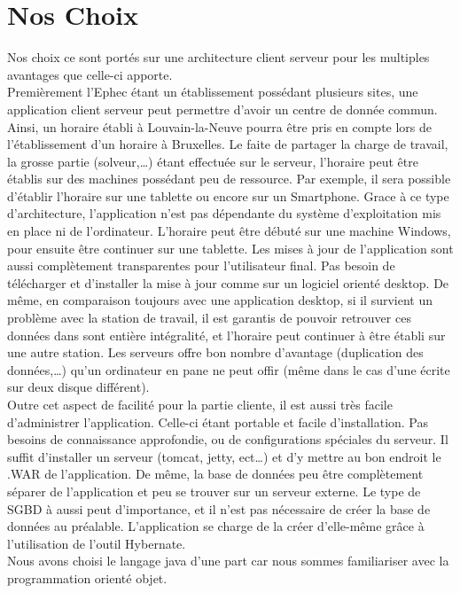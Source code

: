 \section{Nos Choix}
Nos choix ce sont portés sur une architecture client serveur pour les multiples
avantages que celle-ci apporte.\\
Premièrement l'Ephec étant un établissement possédant plusieurs sites,
 une application client serveur peut permettre d'avoir un centre de donnée commun.
 Ainsi, un horaire établi à Louvain-la-Neuve pourra être pris en compte lors de l'établissement d'un horaire à Bruxelles.
Le faite de partager la charge de travail, la grosse partie (solveur,…) étant effectuée sur le serveur, l'horaire peut être établis sur des machines possédant peu de ressource. Par exemple, il sera possible d'établir l'horaire sur une tablette ou encore sur un Smartphone. Grace à ce type d'architecture, l'application n'est pas dépendante du système d'exploitation mis en place ni de l'ordinateur. L'horaire peut être débuté sur une machine Windows, pour ensuite être continuer sur une tablette.
Les mises à jour de l'application sont aussi complètement transparentes pour l'utilisateur final. Pas besoin de télécharger et d'installer la mise à jour comme sur un logiciel orienté desktop.
De même, en comparaison toujours avec une application desktop, si il survient un problème avec la station de travail, il est garantis de pouvoir retrouver ces données dans sont entière intégralité, et l'horaire peut continuer à être établi sur une autre station. Les serveurs offre bon nombre d'avantage (duplication des données,…) qu'un ordinateur en pane ne peut offir (même dans le cas d'une écrite sur deux disque différent).
\\
Outre cet aspect de facilité pour la partie cliente, il est aussi très facile d'administrer l'application. Celle-ci étant portable et facile d'installation.
Pas besoins de connaissance approfondie, ou de configurations spéciales du serveur. Il suffit d'installer un serveur (tomcat, jetty, ect…) et d'y mettre au bon endroit le .WAR de l'application. De même, la base de données peu être complètement séparer de l'application et peu se trouver sur un serveur externe. Le type de SGBD à aussi peut d'importance, et il n'est pas nécessaire de créer la base de données au préalable. L'application se charge de la créer d'elle-même grâce à l'utilisation de l'outil Hybernate.
\\
Nous avons choisi le langage java d'une part car nous sommes familiariser avec la programmation orienté objet.
